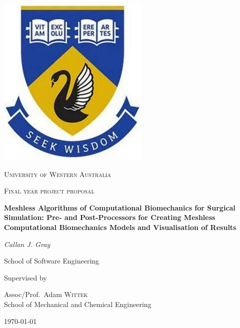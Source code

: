 \begin{titlepage}


\thispagestyle{empty}
\setlength\headheight{0pt} 
\begin{center}

\begin{center}
\includegraphics[width=0.25\linewidth]{img/uwa.PNG}            
\end{center}	

        \vspace{0.25cm}
        {\scshape\LARGE University of Western Australia \par}
        \vspace{0.25cm}
        {\scshape\Large Final year project proposal\par}
        \vspace{0.5cm}

        {\Large\bfseries Meshless Algorithms of Computational Biomechanics for Surgical Simulation: Pre- and Post-Processors for Creating Meshless Computational Biomechanics Models and Visualisation of Results\par}
        
        \vspace{0.5cm}
        {\Large\itshape Callan J. Gray\par}
        School of Software Engineering
        \vspace{0.25cm}

\vspace{1cm}
Supervised by\par
Assoc/Prof.~Adam \textsc{Wittek} \\
School of Mechanical and Chemical Engineering\par
\vspace{0.5cm}
\large
\today

\end{center}

\clearpage
\restoregeometry
\end{titlepage}
